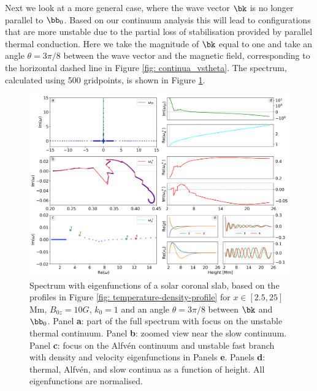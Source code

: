 Next we look at a more general case, where the wave vector $\bk$ is no longer parallel to $\bb_0$. Based on our continuum analysis this will lead to configurations that are more unstable due to the partial loss of stabilisation provided by parallel thermal conduction. Here we take the magnitude of $\bk$ equal to one and take an angle $\theta = 3\pi/8$ between the wave vector and the magnetic field, corresponding to the horizontal dashed line in Figure \ref{fig: continua_vstheta}. The spectrum, calculated using 500 gridpoints, is shown in Figure \ref{fig: spectrum_corona_kxky}.

\begin{figure}[t]
  \centering
  \includegraphics[width=\textwidth]{SA_corona_kx_ky.png}
  \caption{
    Spectrum with eigenfunctions of a solar coronal slab, based on the profiles in Figure \ref{fig: temperature-density-profile} for $x \in [2.5, 25]$ Mm, $B_{0z} = 10 G$, $k_0 = 1$ and an angle $\theta = 3\pi/8$ between $\bk$ and $\bb_0$. Panel \textbf{a}: part of the full spectrum with focus on the unstable thermal continuum. Panel \textbf{b}: zoomed view near the slow continuum. Panel \textbf{c}: focus on the Alfv\'en continuum and unstable fast branch with density and velocity eigenfunctions in Panels \textbf{e}. Panels \textbf{d}: thermal, Alfv\'en, and slow continua as a function of height. All eigenfunctions are normalised.
  }
  \label{fig: spectrum_corona_kxky}
\end{figure}

